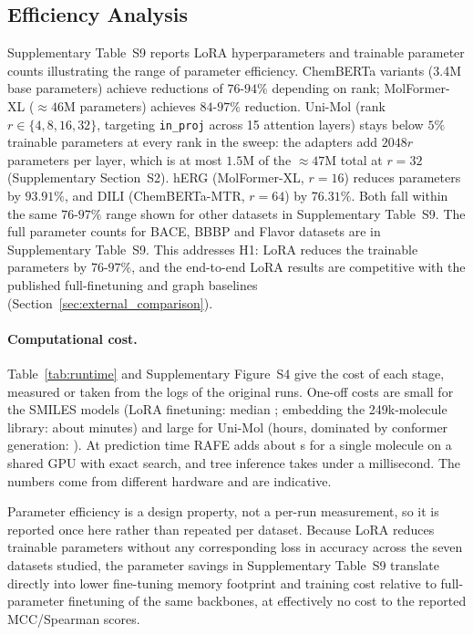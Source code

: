 \documentclass[pdflatex,sn-basic]{sn-jnl}%
\begin{document}
\FloatBarrier
\subsection{Efficiency Analysis}\label{sec:efficiency}
Supplementary Table~S9 reports LoRA hyperparameters and trainable parameter counts illustrating the range of parameter efficiency. ChemBERTa variants (3.4M base parameters) achieve reductions of $76$-$94\%$ depending on rank; MolFormer-XL ($\approx 46$M parameters) achieves $84$-$97\%$ reduction. Uni-Mol (rank $r \in \{4,8,16,32\}$, targeting \texttt{in\_proj} across 15 attention layers) stays below $5\%$ trainable parameters at every rank in the sweep: the adapters add $2048r$ parameters per layer, which is at most $1.5$M of the $\approx47$M total at $r=32$ (Supplementary Section~S2). hERG (MolFormer-XL, $r=16$) reduces parameters by $93.91\%$, and DILI (ChemBERTa-MTR, $r=64$) by $76.31\%$. Both fall within the same $76$-$97\%$ range shown for other datasets in Supplementary Table~S9. The full parameter counts for BACE, BBBP and Flavor datasets are in Supplementary Table~S9. This addresses H1: LoRA reduces the trainable parameters by $76$-$97\%$, and the end-to-end LoRA results are competitive with the published full-finetuning and graph baselines (Section~\ref{sec:external_comparison}).

\paragraph{Computational cost.} Table~\ref{tab:runtime} and Supplementary Figure~S4 give the cost of each stage, measured or taken from the logs of the original runs. One-off costs are small for the SMILES models (LoRA finetuning: median \lorarun{}; embedding the 249k-molecule library: about \zhmin{} minutes) and large for Uni-Mol (hours, dominated by conformer generation: \umhours{}). At prediction time RAFE adds about \raferq{} s for a single molecule on a shared GPU with exact search, and tree inference takes under a millisecond. The numbers come from different hardware and are indicative.

\begin{table}[!ht]
\centering
\caption{Runtime of the pipeline stages.}
\label{tab:runtime}
\scriptsize

\end{table}

Parameter efficiency is a design property, not a per-run measurement, so it is reported once here rather than repeated per dataset. Because LoRA reduces trainable parameters without any corresponding loss in accuracy across the seven datasets studied, the parameter savings in Supplementary Table~S9 translate directly into lower fine-tuning memory footprint and training cost relative to full-parameter finetuning of the same backbones, at effectively no cost to the reported MCC/Spearman scores.
\end{document}
